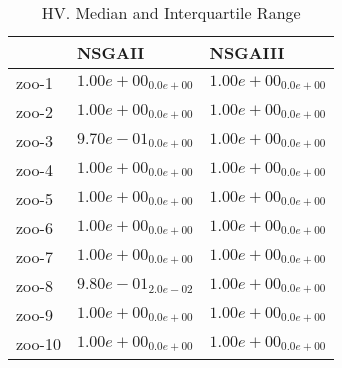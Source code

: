 \documentclass{article}
\begin{document}
\begin{table}
\caption{HV. Median and Interquartile Range}
\label{table: HV}
\centering
\begin{scriptsize}
\begin{tabular}{lll}
\hline & NSGAII &  NSGAIII\\
\hline 
zoo-1 & \cellcolor{gray95}$  1.00e+00_{ 0.0e+00}$ & \cellcolor{gray25}$  1.00e+00_{ 0.0e+00}$ \\
zoo-2 & \cellcolor{gray95}$  1.00e+00_{ 0.0e+00}$ & \cellcolor{gray25}$  1.00e+00_{ 0.0e+00}$ \\
zoo-3 & \cellcolor{gray25}$  9.70e-01_{ 0.0e+00}$ & \cellcolor{gray95}$  1.00e+00_{ 0.0e+00}$ \\
zoo-4 & \cellcolor{gray95}$  1.00e+00_{ 0.0e+00}$ & \cellcolor{gray25}$  1.00e+00_{ 0.0e+00}$ \\
zoo-5 & \cellcolor{gray95}$  1.00e+00_{ 0.0e+00}$ & \cellcolor{gray25}$  1.00e+00_{ 0.0e+00}$ \\
zoo-6 & \cellcolor{gray95}$  1.00e+00_{ 0.0e+00}$ & \cellcolor{gray25}$  1.00e+00_{ 0.0e+00}$ \\
zoo-7 & \cellcolor{gray95}$  1.00e+00_{ 0.0e+00}$ & \cellcolor{gray25}$  1.00e+00_{ 0.0e+00}$ \\
zoo-8 & \cellcolor{gray25}$  9.80e-01_{ 2.0e-02}$ & \cellcolor{gray95}$  1.00e+00_{ 0.0e+00}$ \\
zoo-9 & \cellcolor{gray95}$  1.00e+00_{ 0.0e+00}$ & \cellcolor{gray25}$  1.00e+00_{ 0.0e+00}$ \\
zoo-10 & \cellcolor{gray95}$  1.00e+00_{ 0.0e+00}$ & \cellcolor{gray25}$  1.00e+00_{ 0.0e+00}$ \\
\hline
\end{tabular}
\end{scriptsize}
\end{table}
\end{document}

